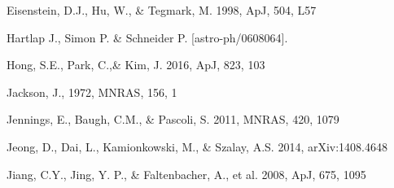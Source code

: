 \documentclass[iop]{emulateapj}
\begin{document}
\begin{thebibliography}{}

Eisenstein, D.J., Hu, W., \& Tegmark, M. 1998, ApJ, 504, L57














Hartlap J., Simon P. \& Schneider P. [astro-ph/0608064].


Hong, S.E., Park, C.,\&  Kim, J. 2016, ApJ, 823, 103

Jackson, J., 1972, MNRAS, 156, 1

Jennings, E., Baugh, C.M., \& Pascoli, S. 2011, MNRAS, 420, 1079  

Jeong, D., Dai, L., Kamionkowski, M., \& Szalay, A.S. 2014, arXiv:1408.4648

Jiang, C.Y., Jing, Y. P., \& Faltenbacher, A., et al. 2008, ApJ, 675, 1095


\end{thebibliography}
\end{document}
